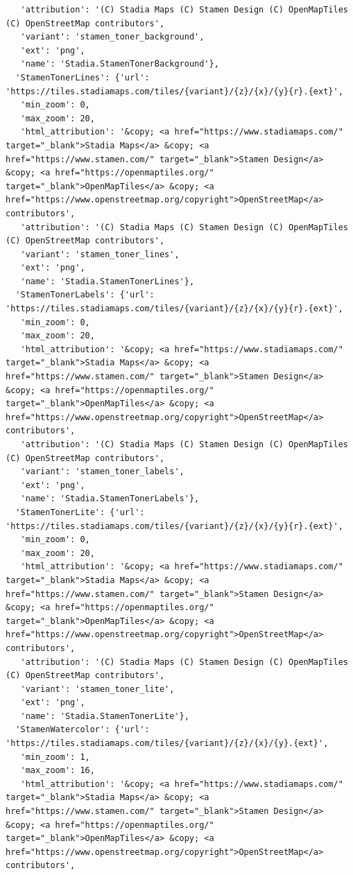 \documentclass[
  letterpaper,
  DIV=11,
  numbers=noendperiod]{scrreprt}
\begin{document}
\begin{verbatim}
   'attribution': '(C) Stadia Maps (C) Stamen Design (C) OpenMapTiles (C) OpenStreetMap contributors',
   'variant': 'stamen_toner_background',
   'ext': 'png',
   'name': 'Stadia.StamenTonerBackground'},
  'StamenTonerLines': {'url': 'https://tiles.stadiamaps.com/tiles/{variant}/{z}/{x}/{y}{r}.{ext}',
   'min_zoom': 0,
   'max_zoom': 20,
   'html_attribution': '&copy; <a href="https://www.stadiamaps.com/" target="_blank">Stadia Maps</a> &copy; <a href="https://www.stamen.com/" target="_blank">Stamen Design</a> &copy; <a href="https://openmaptiles.org/" target="_blank">OpenMapTiles</a> &copy; <a href="https://www.openstreetmap.org/copyright">OpenStreetMap</a> contributors',
   'attribution': '(C) Stadia Maps (C) Stamen Design (C) OpenMapTiles (C) OpenStreetMap contributors',
   'variant': 'stamen_toner_lines',
   'ext': 'png',
   'name': 'Stadia.StamenTonerLines'},
  'StamenTonerLabels': {'url': 'https://tiles.stadiamaps.com/tiles/{variant}/{z}/{x}/{y}{r}.{ext}',
   'min_zoom': 0,
   'max_zoom': 20,
   'html_attribution': '&copy; <a href="https://www.stadiamaps.com/" target="_blank">Stadia Maps</a> &copy; <a href="https://www.stamen.com/" target="_blank">Stamen Design</a> &copy; <a href="https://openmaptiles.org/" target="_blank">OpenMapTiles</a> &copy; <a href="https://www.openstreetmap.org/copyright">OpenStreetMap</a> contributors',
   'attribution': '(C) Stadia Maps (C) Stamen Design (C) OpenMapTiles (C) OpenStreetMap contributors',
   'variant': 'stamen_toner_labels',
   'ext': 'png',
   'name': 'Stadia.StamenTonerLabels'},
  'StamenTonerLite': {'url': 'https://tiles.stadiamaps.com/tiles/{variant}/{z}/{x}/{y}{r}.{ext}',
   'min_zoom': 0,
   'max_zoom': 20,
   'html_attribution': '&copy; <a href="https://www.stadiamaps.com/" target="_blank">Stadia Maps</a> &copy; <a href="https://www.stamen.com/" target="_blank">Stamen Design</a> &copy; <a href="https://openmaptiles.org/" target="_blank">OpenMapTiles</a> &copy; <a href="https://www.openstreetmap.org/copyright">OpenStreetMap</a> contributors',
   'attribution': '(C) Stadia Maps (C) Stamen Design (C) OpenMapTiles (C) OpenStreetMap contributors',
   'variant': 'stamen_toner_lite',
   'ext': 'png',
   'name': 'Stadia.StamenTonerLite'},
  'StamenWatercolor': {'url': 'https://tiles.stadiamaps.com/tiles/{variant}/{z}/{x}/{y}.{ext}',
   'min_zoom': 1,
   'max_zoom': 16,
   'html_attribution': '&copy; <a href="https://www.stadiamaps.com/" target="_blank">Stadia Maps</a> &copy; <a href="https://www.stamen.com/" target="_blank">Stamen Design</a> &copy; <a href="https://openmaptiles.org/" target="_blank">OpenMapTiles</a> &copy; <a href="https://www.openstreetmap.org/copyright">OpenStreetMap</a> contributors',

\end{verbatim}
\end{document}
